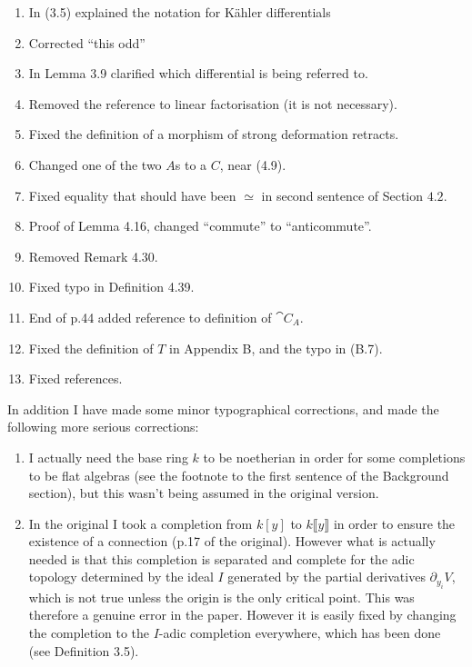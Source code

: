 \documentclass[english,letter paper,12pt,leqno]{article}
\theoremstyle{example}
\numberwithin{equation}{section}
\begin{document}
\begin{enumerate}
\item In (3.5) explained the notation for K\"ahler differentials

\item Corrected ``this odd''

\item In Lemma 3.9 clarified which differential is being referred to.

\item Removed the reference to linear factorisation (it is not necessary).

\item Fixed the definition of a morphism of strong deformation retracts.

\item Changed one of the two $A$s to a $C$, near (4.9).

\item Fixed equality that should have been $\simeq$ in second sentence of Section $4.2$.

\item Proof of Lemma 4.16, changed ``commute'' to ``anticommute''.

\item Removed Remark 4.30.

\item Fixed typo in Definition 4.39.

\item End of p.44 added reference to definition of $\cat{C}_A$.

\item Fixed the definition of $T$ in Appendix B, and the typo in (B.7).

\item Fixed references.

\end{enumerate}

In addition I have made some minor typographical corrections, and made the following more serious corrections:

\begin{enumerate}
\item I actually need the base ring $k$ to be noetherian in order for some completions to be flat algebras (see the footnote to the first sentence of the Background section), but this wasn't being assumed in the original version. 
\item In the original I took a completion from $k[y]$ to $k\llbracket y \rrbracket$ in order to ensure the existence of a connection (p.17 of the original). However what is actually needed is that this completion is separated and complete for the adic topology determined by the ideal $I$ generated by the partial derivatives $\partial_{y_i} V$, which is not true unless the origin is the only critical point. This was therefore a genuine error in the paper. However it is easily fixed by changing the completion to the $I$-adic completion everywhere, which has been done (see Definition 3.5).
\end{enumerate}
\end{document}
